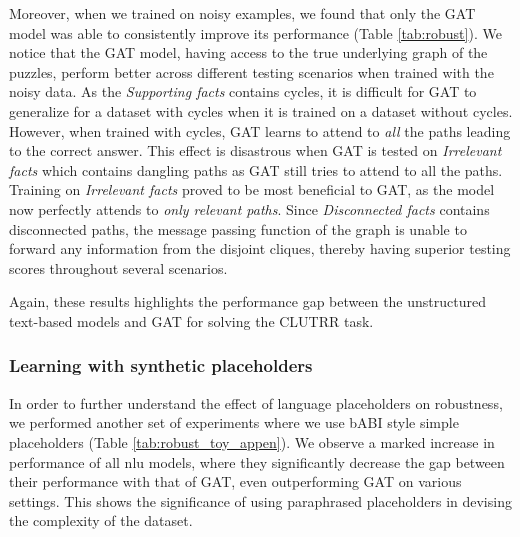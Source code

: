 \documentclass[letterpaper, 12pt]{report}
\begin{document}
Moreover, when we trained on noisy examples, we found that only the GAT model was able to consistently improve its performance (Table \ref{tab:robust}).
We notice that the GAT model, having access to the true underlying graph of the puzzles, perform better across different testing scenarios when trained with the noisy data. As the \textit{Supporting facts} contains cycles, it is difficult for GAT to generalize for a dataset with cycles when it is trained on a dataset without cycles. However, when trained with cycles, GAT learns to attend to \textit{all} the paths leading to the correct answer. This effect is disastrous when GAT is tested on \textit{Irrelevant facts} which contains dangling paths as GAT still tries to attend to all the paths. Training on \textit{Irrelevant facts} proved to be most beneficial to GAT, as the model now perfectly attends to \textit{only relevant paths}.
Since \textit{Disconnected facts} contains disconnected paths, the message passing function of the graph is unable to forward any information from the disjoint cliques, thereby having superior testing scores throughout several scenarios.



Again, these results highlights the performance gap between the unstructured text-based models and GAT for solving the CLUTRR task.

\subsubsection{Learning with synthetic placeholders}

In order to further understand the effect of language placeholders on robustness, we performed another set of experiments where we use bABI \cite{Weston2015-is} style simple placeholders (Table \ref{tab:robust_toy_appen}). We observe a marked increase in performance of all \acrshort{nlu} models, where they significantly decrease the gap between their performance with that of GAT, even outperforming GAT on various settings. This shows the significance of using paraphrased placeholders in devising the complexity of the dataset.







\end{document}
